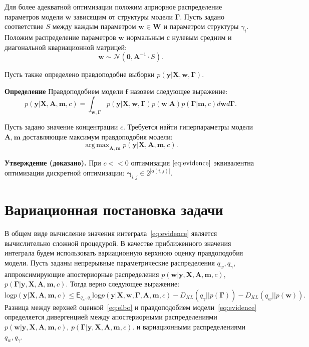 \documentclass[12pt]{article}
\DeclareMathOperator*{\argmax}{arg\,max}
\begin{document}
Для более адекватной оптимизации положим априорное распределение параметров модели $\mathbf{w}$ зависящим от структуры модели $\boldsymbol{\Gamma}$.  Пусть задано соответствие $S$ между каждым параметром $\mathbf{w} \in \mathbf{W}$ и параметром структуры $\gamma_i$.
Положим распределение параметров $\mathbf{w}$ нормальным с нулевым средним и диагональной квариационной матрицей:
\[
    \mathbf{w} \sim \mathcal{N}(\mathbf{0}, \mathbf{A}^{-1} \cdot S).
\]


Пусть также определено правдоподобие выборки $p(\mathbf{y}|\mathbf{X}, \mathbf{w}, \boldsymbol{\Gamma}).$

\textbf{Определение} Правдоподобием модели $\mathbf{f}$ назовем следующее выражение: 
\begin{equation}
\label{eq:evidence}
	p(\mathbf{y}|\mathbf{X},\mathbf{A},\mathbf{m}, c) = \int_{\mathbf{w}, \boldsymbol{\Gamma} } p(\mathbf{y}|\mathbf{X},\mathbf{w},  \boldsymbol{\Gamma})p(\mathbf{w}|\mathbf{A})p(\boldsymbol{\Gamma}|\mathbf{m}, c)d\mathbf{w}d\mathbf{\Gamma}.
\end{equation}

Пусть задано значение концентрации $c$. 
Требуется найти гиперпараметры модели $\mathbf{A}, \mathbf{m}$ доставляющие максимум правдоподобия модели:
\[
    \argmax_{\mathbf{A}, \mathbf{m}}  p(\mathbf{y}|\mathbf{X},\mathbf{A},\mathbf{m}, c).
\]

\textbf{Утверждение (доказано).} При $c << 0$ оптимизация  $\eqref{eq:evidence}$ эквивалентна оптимизации дискретной оптимизации: $\boldsymbol{\gamma}_{i,j} \in 2^{|\mathbf{o}(i,j)|}$.


\section{Вариационная постановка задачи}
В общем виде вычисление значения интеграла~\eqref{eq:evidence} является вычислительно сложной процедурой. В качестве приближенного значения интеграла будем использовать вариационную верхнюю оценку правдоподобия модели. Пусть заданы непрерывные параметрические распределения $q_w, q_\gamma$, аппроксимирующие апостериорные распределения $p(\mathbf{w}|\mathbf{y}, \mathbf{X}, \mathbf{A},\mathbf{m}, c)$, $p(\boldsymbol{\Gamma}|\mathbf{y}, \mathbf{X}, \mathbf{A},\mathbf{m}, c).$ Тогда верно следующее выражение:
\begin{equation}
\label{eq:elbo}
    \text{log} p(\mathbf{y}|\mathbf{X},\mathbf{A},\mathbf{m}, c)  \leq \mathsf{E}_{q_w,q_\gamma}\text{log} p(\mathbf{y}|\mathbf{X},\mathbf{w}, \boldsymbol{\Gamma}, \mathbf{A},\mathbf{m}, c) - {D_{KL}}(q_\gamma||p(\boldsymbol{\Gamma})) - {D_{KL}}(q_{w}||p(\mathbf{w})).
\end{equation}
Разница между верхней оценкой~\eqref{eq:elbo} и правдоподобием модели~\eqref{eq:evidence} определяется дивергенцией между апостериорными распределениями $p(\mathbf{w}|\mathbf{y}, \mathbf{X}, \mathbf{A},\mathbf{m}, c)$, $p(\boldsymbol{\Gamma}|\mathbf{y}, \mathbf{X}, \mathbf{A},\mathbf{m}, c).$ и вариационными распределениями  $q_w, q_\gamma$.
\end{document}

